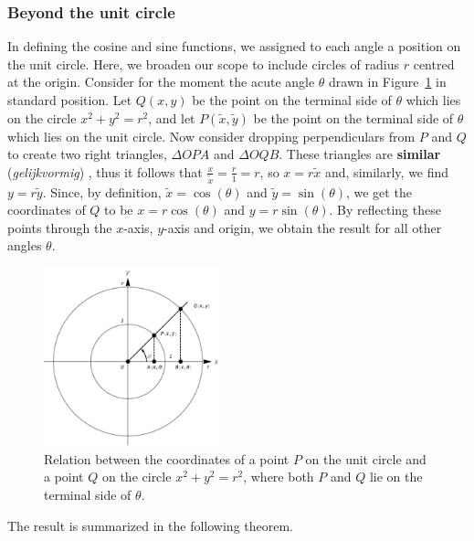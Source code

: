 \fi

\subsubsection{Beyond the unit circle}
In defining the cosine and sine functions, we assigned to each angle a position on the unit circle.  Here, we broaden our scope to include circles of radius $r$ centred at the origin.  Consider for the moment the acute angle $\theta$ drawn in Figure~\ref{fig_trans_15} in standard position. Let $Q(x,y)$ be the point on the terminal side of $\theta$ which lies on the circle $x^2+y^2 = r^2$, and let $P(\widetilde{x},\widetilde{y})$ be the point on the terminal side of $\theta$ which lies on the unit circle.   Now consider dropping perpendiculars from $P$ and $Q$ to create two right triangles, $\Delta OPA$ and $\Delta OQB$. These triangles are \textbf{similar} (\textit{gelijkvormig})  , thus it follows that $\frac{x}{\widetilde{x}} = \frac{r}{1} = r$, so $x = r \widetilde{x}$ and, similarly, we find $y = r \widetilde{y}$.  Since, by definition, $\widetilde{x} = \cos(\theta)$ and $\widetilde{y} = \sin(\theta)$,  we get the coordinates of $Q$ to be $x = r \cos(\theta)$ and $y = r \sin(\theta)$.  By reflecting these points through the $x$-axis, $y$-axis and origin, we obtain the result for all other angles $\theta$.

\begin{figure}
	\begin{center}
			\includegraphics[width=0.45\textwidth]{fig_trans_15}
	\caption{Relation between the coordinates of a point $P$ on the unit circle and a point $Q$ on the circle $x^2+y^2 = r^2$, where both $P$ and $Q$ lie on the terminal side of $\theta$. }
	\label{fig_trans_15}
	\end{center}
\end{figure}

\pagebreak
The result is summarized in the following theorem.


